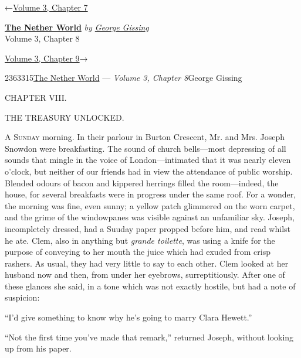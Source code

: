 \hypertarget{headerContainer}{}
\hypertarget{navigationHeader}{}
\protect\hypertarget{headerprevious}{}{←\href{/wiki/The_Nether_World/Volume_3/Chapter_7}{Volume
3, Chapter 7}}

\textbf{\protect\hypertarget{header_title_text}{}{\href{/wiki/The_Nether_World}{The
Nether World}}} \emph{by
\href{/wiki/Author:George_Gissing}{\protect\hypertarget{header_author_text}{}{{George
Gissing}}}}\\
\protect\hypertarget{header_section_text}{}{Volume 3, Chapter 8}

\protect\hypertarget{headernext}{}{\href{/wiki/The_Nether_World/Volume_3/Chapter_9}{Volume
3, Chapter 9}→}

\hypertarget{navigationNotes}{}

\hypertarget{ws-data}{}
\protect\hypertarget{ws-article-id}{}{2363315}\protect\hypertarget{ws-title}{}{\href{/wiki/The_Nether_World}{The
Nether World} --- \emph{Volume 3, Chapter
8}}\protect\hypertarget{ws-author}{}{George Gissing}

{\protect\hypertarget{156}{}{}}

{CHAPTER VIII.}

THE TREASURY UNLOCKED.

\textsc{A Sunday} morning. In their parlour in Burton Crescent, Mr. and
Mrs. Joseph Snowdon were breakfasting. The sound of church bells---most
depressing of all sounds that mingle in the voice of London---intimated
that it was nearly eleven o'clock, but neither of our friends had in
view the attendance of public worship. Blended odours of bacon and
kippered herrings filled the room---indeed, the house, for several
breakfasts were in progress under the same roof. For a wonder, the
morning was fine, even sunny; a yellow patch glimmered on the worn
carpet, and the grime of the windowpanes was visible against an
unfamiliar sky. Joseph, incompletely dressed, had a Suuday paper propped
before him, and read whilst he ate. Clem, also in anything but
\emph{grande toilette}, was using a knife for the purpose of
{\protect\hypertarget{157}{}{}}conveying to her mouth the juice which
had exuded from crisp rashers. As usual, they had very little to say to
each other. Clem looked at her husband now and then, from under her
eyebrows, surreptitiously. After one of these glances she said, in a
tone which was not exactly hostile, but had a note of suspicion:

``I'd give something to know why he's going to marry Clara Hewett.''

``Not the first time you've made that remark,'' returned Joseph, without
looking up from his paper.


